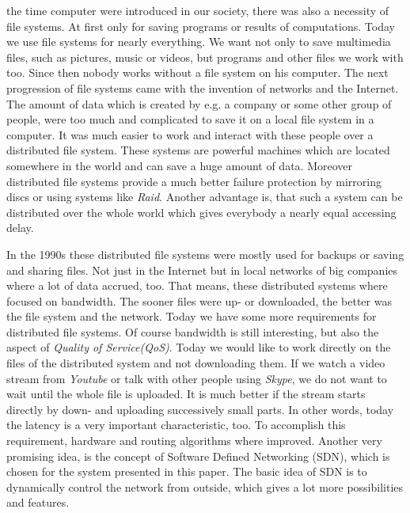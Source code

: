  the time computer were introduced in our society, there was also a necessity of file systems. At first only for saving programs or results of computations. Today we use file systems for nearly everything. We want not only to save multimedia files, such as pictures, music or videos, but programs and other files we work with too. Since then nobody works without a file system on his computer. The next progression of file systems came with the invention of networks and the Internet. The amount of data which is created by e.g. a company or some other group of people, were too much and complicated to save it on a local file system in a computer. It was much easier to work and interact with these people over a distributed file system. These systems are powerful machines which are located somewhere in the world and can save a huge amount of data. Moreover distributed file systems provide a much better failure protection by mirroring discs or using systems like \textit{Raid}. Another advantage is, that such a system can be distributed over the whole world which gives everybody a nearly equal accessing delay.

In the 1990s these distributed file systems were mostly used for backups or saving and sharing files. Not just in the Internet but in local networks of big companies where a lot of data accrued, too. That means, these distributed systems where focused on bandwidth. The sooner files were up- or downloaded, the better was the file system and the network. Today we have some more requirements for distributed file systems. Of course bandwidth is still interesting, but also the aspect of \textit{Quality of Service(QoS)}. Today we would like to work directly on the files of the distributed system and not downloading them. If we watch a video stream from \textit{Youtube} or talk with other people using \textit{Skype}, we do not want to wait until the whole file is uploaded. It is much better if the stream starts directly by down- and uploading successively small parts. In other words, today the latency is a very important characteristic, too. To accomplish this requirement, hardware and routing algorithms where improved. Another very promising idea, is the concept of Software Defined Networking (SDN), which is chosen for the system presented in this paper. The basic idea of SDN is to dynamically control the network from outside, which gives a lot more possibilities and features.  

